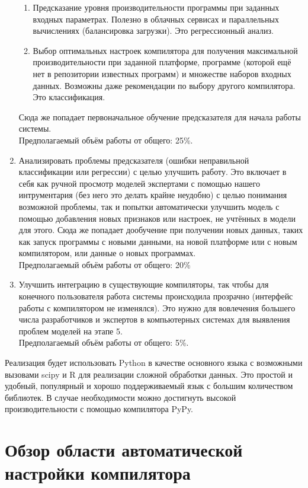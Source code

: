 \begin{enumerate}
{\begin{enumerate}
	\item Предсказание уровня производительности программы при заданных входных параметрах. Полезно в облачных сервисах и параллельных вычислениях (балансировка загрузки). Это регрессионный анализ.
	\item Выбор оптимальных настроек компилятора для получения максимальной производительности при заданной платформе, программе (которой ещё нет в репозитории известных программ) и множестве наборов входных данных. Возможны даже рекомендации по выбору другого компилятора. Это классификация.
	\end{enumerate}
Сюда же попадает первоначальное обучение предсказателя для начала работы системы.\\
Предполагаемый объём работы от общего: 25\%.}
\item {Анализировать проблемы предсказателя (ошибки неправильной классификации или регрессии) с целью улучшить работу.
Это включает в себя как ручной просмотр моделей экспертами с помощью нашего интрументария (без него это делать крайне неудобно) с целью понимания возможной проблемы, так и попытки автоматически улучшить модель с помощью добавления новых признаков или настроек, не учтённых в модели для этого.
Сюда же попадает дообучение при получении новых данных, таких как запуск программы с новыми данными, на новой платформе или с новым компилятором, или данные о новых программах.\\
Предполагаемый объём работы от общего: 20\%}
\item {Улучшить интеграцию в существующие компиляторы, так чтобы для конечного пользователя работа системы происходила прозрачно (интерфейс работы с компилятором не изменялся). Это нужно для вовлечения большего числа разработчиков и экспертов в компьютерных системах для выявления проблем моделей на этапе 5.\\
Предполагаемый объём работы от общего: 5\%.}
\end{enumerate}

Реализация будет использовать Python в качестве основного языка с возможными вызовами scipy и R для реализации сложной обработки данных. Это простой и удобный, популярный и хорошо поддерживаемый язык с большим количеством библиотек. В случае необходимости можно достигнуть высокой производительности с помощью компилятора PyPy.

\section{Обзор области автоматической настройки компилятора}
